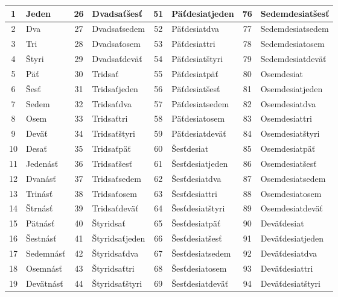 \documentclass{article}
\begin{document}
\begin{table}[H]
  \centering
  \renewcommand{\arraystretch}{1.2}
  \begin{tabular}{|cl|cl|cl|cl|}
    \hline
    1 & Jeden & 26 & Dvadsaťšesť & 51 & Päťdesiatjeden & 76 & Sedemdesiatšesť \\
    \hline
    2 & Dva & 27 & Dvadsaťsedem & 52 & Päťdesiatdva & 77 & Sedemdesiatsedem \\
    \hline
    3 & Tri & 28 & Dvadsaťosem & 53 & Päťdesiattri & 78 & Sedemdesiatosem \\
    \hline
    4 & Štyri & 29 & Dvadsaťdeväť & 54 & Päťdesiatštyri & 79 & Sedemdesiatdeväť \\
    \hline
    5 & Päť & 30 & Tridsať & 55 & Päťdesiatpäť & 80 & Osemdesiat \\
    \hline
    6 & Šesť & 31 & Tridsaťjeden & 56 & Päťdesiatšesť & 81 & Osemdesiatjeden \\
    \hline
    7 & Sedem & 32 & Tridsaťdva & 57 & Päťdesiatsedem & 82 & Osemdesiatdva \\
    \hline
    8 & Osem & 33 & Tridsaťtri & 58 & Päťdesiatosem & 83 & Osemdesiattri \\
    \hline
    9 & Deväť & 34 & Tridsaťštyri & 59 & Päťdesiatdeväť & 84 & Osemdesiatštyri \\
    \hline
    10 & Desať & 35 & Tridsaťpäť & 60 & Šesťdesiat & 85 & Osemdesiatpäť \\
    \hline
    11 & Jedenásť & 36 & Tridsaťšesť & 61 & Šesťdesiatjeden & 86 & Osemdesiatšesť \\
    \hline
    12 & Dvanásť & 37 & Tridsaťsedem & 62 & Šesťdesiatdva & 87 & Osemdesiatsedem \\
    \hline
    13 & Trinásť & 38 & Tridsaťosem & 63 & Šesťdesiattri & 88 & Osemdesiatosem \\
    \hline
    14 & Štrnásť & 39 & Tridsaťdeväť & 64 & Šesťdesiatštyri & 89 & Osemdesiatdeväť \\
    \hline
    15 & Pätnásť & 40 & Štyridsať & 65 & Šesťdesiatpäť & 90 & Deväťdesiat \\
    \hline
    16 & Šestnásť & 41 & Štyridsaťjeden & 66 & Šesťdesiatšesť & 91 & Deväťdesiatjeden \\
    \hline
    17 & Sedemnásť & 42 & Štyridsaťdva & 67 & Šesťdesiatsedem & 92 & Deväťdesiatdva \\
    \hline
    18 & Osemnásť & 43 & Štyridsaťtri & 68 & Šesťdesiatosem & 93 & Deväťdesiattri \\
    \hline
    19 & Devätnásť & 44 & Štyridsaťštyri & 69 & Šesťdesiatdeväť & 94 & Deväťdesiatštyri \\

\end{tabular}
\end{table}
\end{document}
